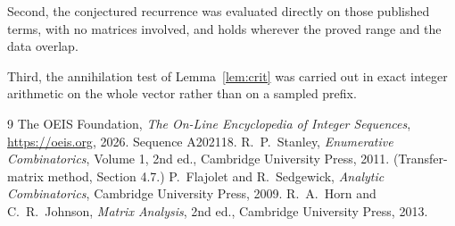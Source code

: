 \documentclass[11pt,a4paper]{article}
\theoremstyle{plain}
\theoremstyle{definition}
\begin{document}
Second, the conjectured recurrence was evaluated directly on those published terms, with no
matrices involved, and holds wherever the proved range and the data overlap.

Third, the annihilation test of Lemma~\ref{lem:crit} was carried out in exact integer
arithmetic on the whole vector rather than on a sampled prefix.

\begin{thebibliography}{9}
 The OEIS Foundation, \emph{The On-Line Encyclopedia of Integer
Sequences}, \url{https://oeis.org}, 2026. Sequence A202118.
 R.~P.~Stanley, \emph{Enumerative Combinatorics}, Volume 1, 2nd ed.,
Cambridge University Press, 2011. (Transfer-matrix method, Section 4.7.)
 P.~Flajolet and R.~Sedgewick, \emph{Analytic Combinatorics}, Cambridge
University Press, 2009.
 R.~A.~Horn and C.~R.~Johnson, \emph{Matrix Analysis}, 2nd ed., Cambridge
University Press, 2013.
\end{thebibliography}
\end{document}
